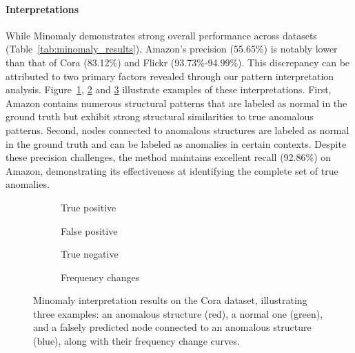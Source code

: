 \documentclass[pdflatex,sn-mathphys-num]{sn-jnl}%
\theoremstyle{thmstyleone}%
\theoremstyle{thmstyletwo}%
\theoremstyle{thmstylethree}%
\begin{document}
\paragraph{Interpretations}
While Minomaly demonstrates strong overall performance across datasets (Table~\ref{tab:minomaly_results}), Amazon's precision (55.65\%) is notably lower than that of Cora (83.12\%) and Flickr (93.73\%-94.99\%). This discrepancy can be attributed to two primary factors revealed through our pattern interpretation analysis. Figure~\ref{fig:true_positive}, \ref{fig:false_positive} and \ref{fig:true_negative} illustrate examples of these interpretations. First, Amazon contains numerous structural patterns that are labeled as normal in the ground truth but exhibit strong structural similarities to true anomalous patterns. Second, nodes connected to anomalous structures are labeled as normal in the ground truth and can be labeled as anomalies in certain contexts. Despite these precision challenges, the method maintains excellent recall (92.86\%) on Amazon, demonstrating its effectiveness at identifying the complete set of true anomalies.

\begin{figure}[H]
    \centering
    \begin{subfigure}{0.2\textwidth}
        \resizebox{\linewidth}{!}{}
        \caption{True positive}
        \label{fig:true_positive}
    \end{subfigure}
    \hfill
    \begin{subfigure}{0.2\textwidth}
        \resizebox{\linewidth}{!}{}
        \caption{False positive}
        \label{fig:false_positive}
    \end{subfigure}
    \hfill
    \begin{subfigure}{0.2\textwidth}
        \resizebox{\linewidth}{!}{}
        \caption{True negative}
        \label{fig:true_negative}
    \end{subfigure}
    \hfill
    \begin{subfigure}{0.3\textwidth}
        \resizebox{\linewidth}{!}{}
        \caption{Frequency changes}
        \label{fig:frequency_track}
    \end{subfigure}
    \caption{Minomaly interpretation results on the Cora dataset, illustrating three examples: an anomalous structure (red), a normal one (green), and a falsely predicted node connected to an anomalous structure (blue), along with their frequency change curves.}
    \label{fig:interpret_results}
\end{figure}
\end{document}
